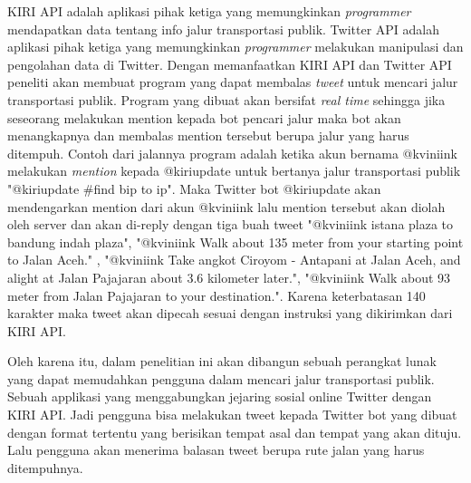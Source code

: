 KIRI API adalah aplikasi pihak ketiga yang memungkinkan \textit{programmer} mendapatkan data tentang info jalur transportasi publik. Twitter API adalah aplikasi pihak ketiga yang memungkinkan \textit{programmer} melakukan manipulasi dan pengolahan data di Twitter. Dengan memanfaatkan KIRI API dan Twitter API peneliti akan membuat program yang dapat membalas \textit{tweet} untuk mencari jalur transportasi publik. Program yang dibuat akan bersifat \textit{real time} sehingga jika seseorang melakukan mention kepada bot pencari jalur maka bot akan menangkapnya dan membalas mention tersebut berupa jalur yang harus ditempuh. Contoh dari jalannya program adalah ketika akun bernama @kviniink melakukan \textit{mention} kepada @kiriupdate untuk bertanya jalur transportasi publik "@kiriupdate \#find bip to ip". Maka Twitter bot @kiriupdate akan mendengarkan mention dari akun @kviniink lalu mention tersebut akan diolah oleh server dan akan di-reply dengan tiga buah tweet "@kviniink istana plaza to bandung indah plaza", "@kviniink Walk about 135 meter from your starting point to Jalan Aceh." , "@kviniink Take angkot Ciroyom - Antapani at Jalan Aceh, and alight at Jalan Pajajaran about 3.6 kilometer later.", "@kviniink Walk about 93 meter from Jalan Pajajaran to your destination.". Karena keterbatasan 140 karakter maka tweet akan dipecah sesuai dengan instruksi yang dikirimkan dari KIRI API.

Oleh karena itu, dalam penelitian ini akan dibangun sebuah perangkat lunak yang dapat memudahkan pengguna dalam mencari jalur transportasi publik. Sebuah applikasi yang menggabungkan jejaring sosial online Twitter dengan KIRI API. Jadi pengguna bisa melakukan tweet kepada Twitter bot yang dibuat dengan format tertentu yang berisikan tempat asal dan tempat yang akan dituju. Lalu pengguna akan menerima balasan tweet berupa rute jalan yang harus ditempuhnya.

